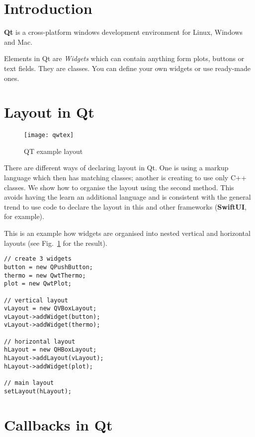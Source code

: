 \documentclass[12pt]{report}
\begin{document}
\section{Introduction}
\textbf{Qt} is a cross-platform windows development environment
for Linux, Windows and Mac.

Elements in Qt are \textsl{Widgets} which can contain
anything form plots, buttons or text fields. They are
classes. You can define your own widgets or use ready-made ones.

\section{Layout in Qt}

\begin{figure}[!hbt]
\begin{center}
\mbox{\texttt{[image: qwtex]}}
\end{center}
\caption{QT example layout
\label{qwtex}}
\end{figure}

There are different ways of declaring layout in Qt. One is
using a markup language which then has matching classes;
another is creating to use only C++ classes.
We show how to organise the layout using the second method.
This avoids having the learn an additional language and is
consistent with the general  trend to use code to declare the layout
in this and other frameworks (\textbf{SwiftUI}, for example).

This is an example how widgets are organised into
nested vertical and horizontal layouts (see Fig.~\ref{qwtex}
for the result).
\begin{verbatim}
// create 3 widgets
button = new QPushButton;
thermo = new QwtThermo; 
plot = new QwtPlot;

// vertical layout
vLayout = new QVBoxLayout;
vLayout->addWidget(button);
vLayout->addWidget(thermo);

// horizontal layout
hLayout = new QHBoxLayout;
hLayout->addLayout(vLayout);
hLayout->addWidget(plot);

// main layout
setLayout(hLayout);
\end{verbatim}


\section{Callbacks in Qt}
\end{document}
